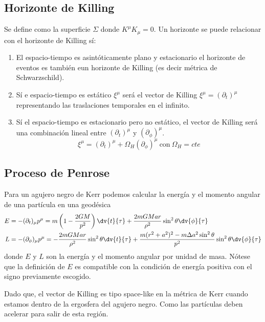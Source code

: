 \documentclass[../main]{subfiles}
\begin{document}
\begin{adjustwidth}{0pt}{-100pt}
\subsection{Horizonte de Killing}

Se define como la superficie $\Sigma$ donde $K^{\mu} K_{\mu}=0$. Un horizonte se puede relacionar con el horizonte de Killing sí:
\begin{enumerate}
    \item El espacio-tiempo es asintóticamente plano y estacionario el horizonte de eventos es también eun horizonte de Killing (es decir métrica de Schwarzschild).
    \item Sí e espacio-tiempo es estático $\xi^{\mu}$ será el vector de Killing $\xi^{\mu}=(\partial_t)^{\mu}$ representando las traslaciones temporales en el infinito.
    \item Sí el espacio-tiempo es estacionario pero no estático, el vector de Killing será una combinación lineal entre $(\partial_t)^{\mu}$ y $(\partial_{\phi})^{\mu}$.
    \begin{equation}
        \xi^{\mu}=(\partial_t)^{\mu}+\Omega_H(\partial_{\phi})^{\mu} \ \text{con} \ \Omega_H=cte
    \end{equation}
\end{enumerate}

\subsection{Proceso de Penrose}

Para un agujero negro de Kerr podemos calcular la energía y el momento angular de una partícula en una geodésica
\begin{align}
    E&=-(\partial_t)_{\mu}p^{\mu}=m\left(1-\dfrac{2GM}{p^2}\right)\dv{t}{\tau}+\dfrac{2mGMar}{\rho^2}\sin^2 \theta \dv{\phi}{\tau} \\
    L&=-(\partial_{\phi})_{\mu} p^{\mu}=-\dfrac{2mGMar}{\rho^2}\sin^2 \theta \dv{t}{\tau}+\dfrac{m(r^2+a^2)^2-m\Delta a^2\sin^2 \theta}{p^2}\sin^2\theta \dv{\phi}{\tau}
\end{align}
donde $E$ y $L$ son la energía y el momento angular por unidad de masa. Nótese que la definición de $E$ es compatible con la condición de energía positiva con el signo previamente escogido.

Dado que, el vector de Killing es tipo space-like en la métrica de Kerr cuando estamos dentro de la ergosfera del agujero negro. Como las partículas deben acelerar para salir de esta región.


\end{adjustwidth}
\end{document}
